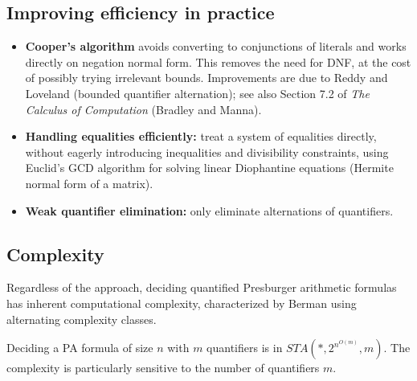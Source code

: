 \subsection{Improving efficiency in practice}
 
\begin{itemize}
  \item \textbf{Cooper's algorithm} avoids converting to conjunctions of literals and works directly on negation normal form. This removes the need for DNF, at the cost of possibly trying irrelevant bounds. Improvements are due to Reddy and Loveland (bounded quantifier alternation); see also Section 7.2 of \emph{The Calculus of Computation} (Bradley and Manna).
  \item \textbf{Handling equalities efficiently:} treat a system of equalities directly, without eagerly introducing inequalities and divisibility constraints, using Euclid's GCD algorithm for solving linear Diophantine equations (Hermite normal form of a matrix).
  \item \textbf{Weak quantifier elimination:} only eliminate alternations of quantifiers.
\end{itemize}
 
\subsection{Complexity}
 
Regardless of the approach, deciding quantified Presburger arithmetic formulas has inherent computational complexity, characterized by Berman using alternating complexity classes.
 
 
Deciding a PA formula of size $n$ with $m$ quantifiers is in $STA(*, 2^{n^{O(m)}}, m)$. The complexity is particularly sensitive to the number of quantifiers $m$.
% 
